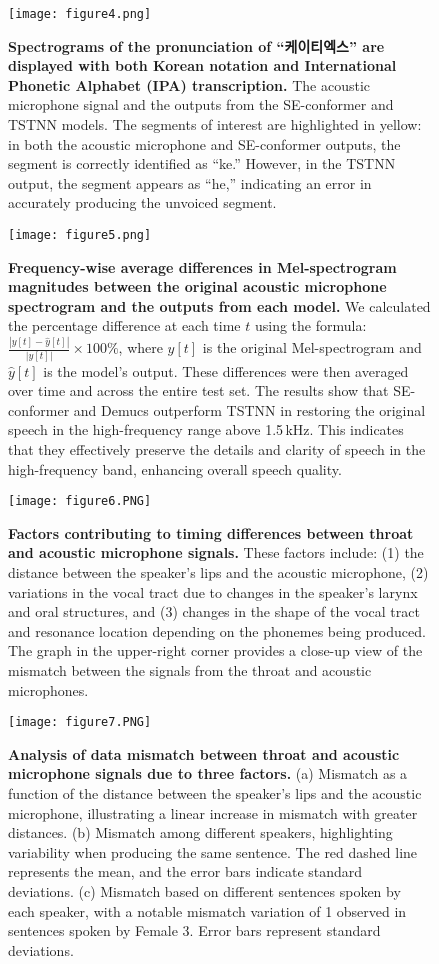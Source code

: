 \documentclass[10pt]{wlscirep}
\begin{document}
\begin{figure}[ht]
\centering
\texttt{[image: figure4.png]}
\caption{\textbf{Spectrograms of the pronunciation of ``케이티엑스'' are displayed with both Korean notation and International Phonetic Alphabet (IPA) transcription.} The acoustic microphone signal and the outputs from the SE-conformer and TSTNN models. The segments of interest are highlighted in yellow: in both the acoustic microphone and SE-conformer outputs, the segment is correctly identified as ``ke.'' However, in the TSTNN output, the segment appears as ``he,'' indicating an error in accurately producing the unvoiced segment.
}
\label{fig:4}
\end{figure}

\begin{figure}[ht]
\centering
\texttt{[image: figure5.png]}
\caption{\textbf{Frequency-wise average differences in Mel-spectrogram magnitudes between the original acoustic microphone spectrogram and the outputs from each model.} We calculated the percentage difference at each time $t$ using the formula: $\frac{|y[t]-\hat{y}[t]|}{|y[t]|}\times 100\%$, where $y[t]$ is the original Mel-spectrogram and $\hat{y}[t]$ is the model's output. These differences were then averaged over time and across the entire test set. The results show that SE-conformer and Demucs outperform TSTNN in restoring the original speech in the high-frequency range above 1.5 kHz. This indicates that they effectively preserve the details and clarity of speech in the high-frequency band, enhancing overall speech quality.
}
\label{fig:5}
\end{figure}

\begin{figure}[ht]
\centering
\texttt{[image: figure6.PNG]}
\caption{\textbf{Factors contributing to timing differences between throat and acoustic microphone signals.} These factors include: (1) the distance between the speaker's lips and the acoustic microphone, (2) variations in the vocal tract due to changes in the speaker's larynx and oral structures, and (3) changes in the shape of the vocal tract and resonance location depending on the phonemes being produced. The graph in the upper-right corner provides a close-up view of the mismatch between the signals from the throat and acoustic microphones.
}
\label{fig:6}
\end{figure}

\begin{figure}[ht]
\centering
\texttt{[image: figure7.PNG]}
\caption{\textbf{Analysis of data mismatch between throat and acoustic microphone signals due to three factors.} (a) Mismatch as a function of the distance between the speaker's lips and the acoustic microphone, illustrating a linear increase in mismatch with greater distances. (b) Mismatch among different speakers, highlighting variability when producing the same sentence. The red dashed line represents the mean, and the error bars indicate standard deviations. (c) Mismatch based on different sentences spoken by each speaker, with a notable mismatch variation of 1 observed in sentences spoken by Female 3. Error bars represent standard deviations.
}
\label{fig:7}
\end{figure}
\end{document}
